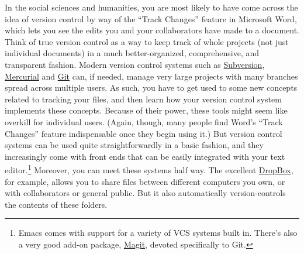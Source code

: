 \documentclass[11pt,article,oneside]{memoir}
\begin{document}
In the social sciences and humanities, you are most likely to have
come across the idea of version control by way of the ``Track
Changes'' feature in Microsoft Word, which lets you see the edits you
and your collaborators have made to a document. Think of true version
control as a way to keep track of whole projects (not just individual
documents) in a much better-organized, comprehensive, and transparent
fashion. Modern version control systems such as
\href{http://subversion.tigris.org/}{Subversion},
\href{http://www.selenic.com/mercurial/}{Mercurial} and
\href{http://git.or.cz/}{Git} can, if needed, manage very large
projects with many branches spread across multiple users. As such, you
have to get used to some new concepts related to tracking your files,
and then learn how your version control system implements these
concepts. Because of their power, these tools might seem like overkill
for individual users. (Again, though, many people find Word's ``Track
Changes'' feature indispensable once they begin using it.) But version
control systems can be used quite straightforwardly in a basic
fashion, and they increasingly come with front ends that can be easily
integrated with your text editor.\footnote{Emacs comes with support
  for a variety of VCS systems built in. There's also a very good
  add-on package, \href{http://philjackson.github.com/magit/}{Magit},
  devoted specifically to Git. } Moreover, you can meet these systems
half way. The excellent \href{https://www.getdropbox.com/}{DropBox},
for example, allows you to share files between different computers you
own, or with collaborators or general public. But it also
automatically version-controls the contents of these folders.
\end{document}
